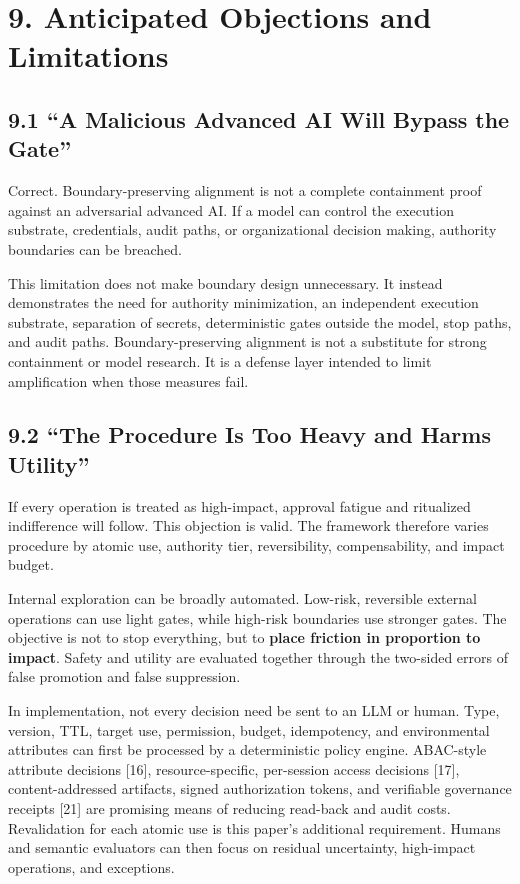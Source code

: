 \section{9. Anticipated Objections and Limitations}\label{anticipated-objections-and-limitations}

\subsection{9.1 ``A Malicious Advanced AI Will Bypass the Gate''}\label{a-malicious-advanced-ai-will-bypass-the-gate}

Correct. Boundary-preserving alignment is not a complete containment proof against an adversarial advanced AI. If a model can control the execution substrate, credentials, audit paths, or organizational decision making, authority boundaries can be breached.

This limitation does not make boundary design unnecessary. It instead demonstrates the need for authority minimization, an independent execution substrate, separation of secrets, deterministic gates outside the model, stop paths, and audit paths. Boundary-preserving alignment is not a substitute for strong containment or model research. It is a defense layer intended to limit amplification when those measures fail.

\subsection{9.2 ``The Procedure Is Too Heavy and Harms Utility''}\label{the-procedure-is-too-heavy-and-harms-utility}

If every operation is treated as high-impact, approval fatigue and ritualized indifference will follow. This objection is valid. The framework therefore varies procedure by atomic use, authority tier, reversibility, compensability, and impact budget.

Internal exploration can be broadly automated. Low-risk, reversible external operations can use light gates, while high-risk boundaries use stronger gates. The objective is not to stop everything, but to \textbf{place friction in proportion to impact}. Safety and utility are evaluated together through the two-sided errors of false promotion and false suppression.

In implementation, not every decision need be sent to an LLM or human. Type, version, TTL, target use, permission, budget, idempotency, and environmental attributes can first be processed by a deterministic policy engine. ABAC-style attribute decisions {[}16{]}, resource-specific, per-session access decisions {[}17{]}, content-addressed artifacts, signed authorization tokens, and verifiable governance receipts {[}21{]} are promising means of reducing read-back and audit costs. Revalidation for each atomic use is this paper's additional requirement. Humans and semantic evaluators can then focus on residual uncertainty, high-impact operations, and exceptions.

